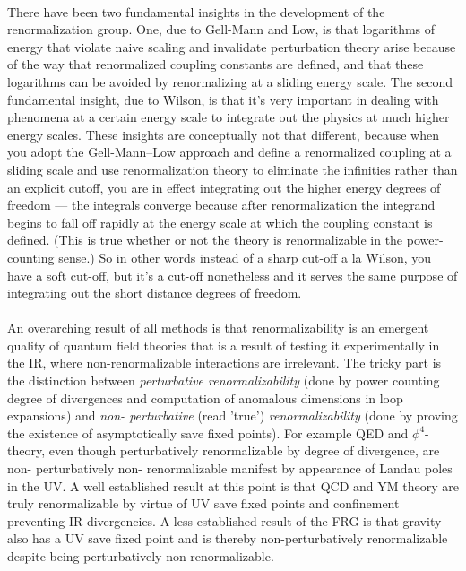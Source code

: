 \\
There have been two fundamental insights in the development of
the renormalization group. One, due to Gell-Mann and Low, is
that logarithms of energy that violate naive scaling and invalidate perturbation theory arise because of the way that renormalized coupling constants are defined, and that these logarithms
can be avoided by renormalizing at a sliding energy scale. The
second fundamental insight, due to Wilson, is that it’s very important in dealing with phenomena at a certain energy scale to
integrate out the physics at much higher energy scales. These insights are conceptually not that different, because when you adopt the
Gell-Mann–Low approach and define a renormalized coupling
at a sliding scale and use renormalization theory to eliminate
the infinities rather than an explicit cutoff, you are in effect integrating out the higher energy degrees of freedom — the integrals
converge because after renormalization the integrand begins to
fall off rapidly at the energy scale at which the coupling constant
is defined. (This is true whether or not the theory is renormalizable in the power-counting sense.) So in other words instead of
a sharp cut-off a la Wilson, you have a soft cut-off, but it’s a cut-off
nonetheless and it serves the same purpose of integrating out the
short distance degrees of freedom.
\\
\\
An overarching result of all methods is that renormalizability is an emergent quality of quantum field theories that is a result of testing it experimentally in the IR, where non-renormalizable interactions are irrelevant. The tricky part is the distinction between \emph{perturbative renormalizability} (done by power counting degree of divergences and computation of anomalous dimensions in loop expansions) and \emph{non- perturbative} (read ’true’) \emph{renormalizability} (done by proving the existence of asymptotically save fixed points). For example QED and $\phi^4$-theory, even though perturbatively renormalizable by degree of divergence, are non- perturbatively non- renormalizable manifest by appearance of Landau poles in the UV. A well established result at this point is that QCD and YM theory are truly renormalizable by virtue of UV save fixed points and confinement preventing IR divergencies. A less established result of the FRG is that gravity also has a UV save fixed point and is thereby non-perturbatively renormalizable despite being perturbatively non-renormalizable.


